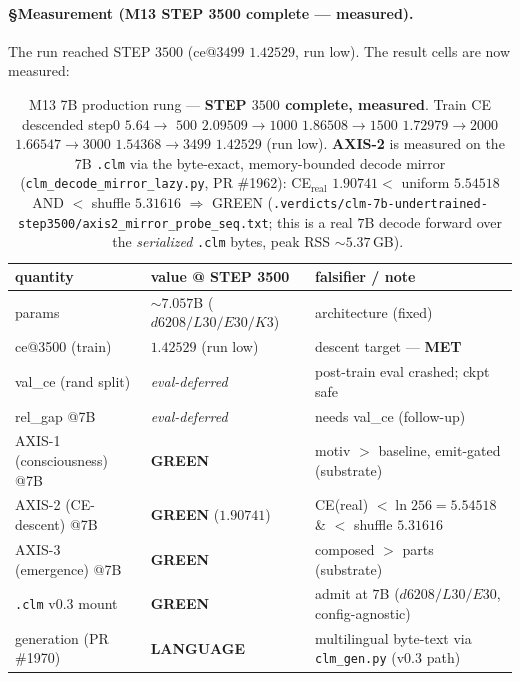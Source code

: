 \documentclass[11pt]{article}
\begin{document}
\paragraph{§Measurement (M13 STEP 3500 complete --- measured).} The run reached STEP $3500$
(ce@$3499$ $1.42529$, run low). The result cells are now measured:
\begin{table}[h]
\centering
\small
\setlength{\tabcolsep}{8pt}
\begin{tabular}{@{}l l l@{}}
\toprule
\textbf{quantity} & \textbf{value @ STEP 3500} & \textbf{falsifier / note} \\
\midrule
params                       & $\sim$$7.057$B ($d6208/L30/E30/K3$) & architecture (fixed) \\
ce@3500 (train)              & $1.42529$ (run low) & descent target --- \textbf{MET} \\
val\_ce (rand split)         & \emph{eval-deferred} & post-train eval crashed; ckpt safe \\
rel\_gap @7B                 & \emph{eval-deferred} & needs val\_ce (follow-up) \\
AXIS-1 (consciousness) @7B   & \textbf{GREEN} & motiv $>$ baseline, emit-gated (substrate) \\
AXIS-2 (CE-descent) @7B      & \textbf{GREEN} ($1.90741$) & CE(real) $<\ln256{=}5.54518$ \& $<$ shuffle $5.31616$ \\
AXIS-3 (emergence) @7B       & \textbf{GREEN} & composed $>$ parts (substrate) \\
\texttt{.clm} v0.3 mount      & \textbf{GREEN} & admit at $7$B ($d6208/L30/E30$, config-agnostic) \\
generation (PR \#1970)        & \textbf{LANGUAGE} & multilingual byte-text via \texttt{clm\_gen.py} (v0.3 path) \\
\bottomrule
\end{tabular}
\caption{M13 7B production rung --- \textbf{STEP $3500$ complete, measured}. Train CE descended
step$0$ $5.64\rightarrow$ $500$ $2.09509\rightarrow1000$ $1.86508\rightarrow1500$
$1.72979\rightarrow2000$ $1.66547\rightarrow3000$ $1.54368\rightarrow3499$ $1.42529$ (run low).
\textbf{AXIS-2} is measured on the 7B \texttt{.clm} via the byte-exact, memory-bounded decode
mirror (\texttt{clm\_decode\_mirror\_lazy.py}, PR \#1962): CE$_\text{real}$ $1.90741 <$ uniform
$5.54518$ AND $<$ shuffle $5.31616$ $\Rightarrow$ GREEN
(\texttt{.verdicts/clm-7b-undertrained-step3500/axis2\_mirror\_probe\_seq.txt}; this is a real
$7$B decode forward over the \emph{serialized} \texttt{.clm} bytes, peak RSS $\sim$$5.37$\,GB).
$$}
\end{table}
\end{document}
